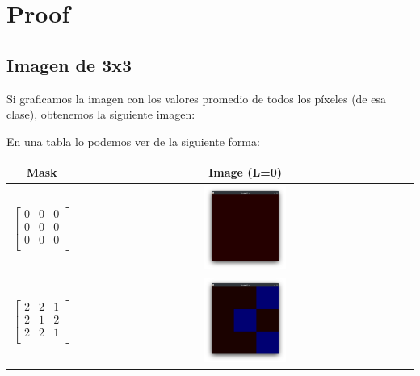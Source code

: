 \section{Proof}\label{sec:proof}

\subsection{Imagen de 3x3}\label{subsec:imagen-de-3x3}




Si graficamos la imagen con los valores promedio de todos los píxeles (de esa clase), obtenemos la siguiente imagen:

En una tabla lo podemos ver de la siguiente forma:


\begin{table}
    \centering
    \begin{tabular}{|c|c|}
        \hline
        Mask & Image (L=0) \\
        \hline
        \begin{equation*}
            \begin{bmatrix}
                0 & 0 & 0 \\
                0 & 0 & 0 \\
                0 & 0 & 0 \\
            \end{bmatrix}
        \end{equation*}
        &
        \includegraphics[width=0.25\textwidth]{./latex/img/m0}
        \\
        \hline
        \begin{equation*}
            \begin{bmatrix}
                2 & 2 & 1 \\
                2 & 1 & 2 \\
                2 & 2 & 1 \\
            \end{bmatrix}
        \end{equation*}
        &
        \includegraphics[width=0.25\textwidth]{./latex/img/m1}

\end{tabular}
\end{table}
